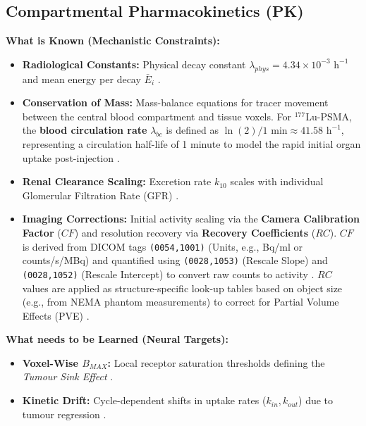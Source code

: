 \documentclass[11pt,a4paper]{article}
\begin{document}
\subsection{Compartmental Pharmacokinetics (PK)}
\textbf{What is Known (Mechanistic Constraints):}
\begin{itemize}
    \item \textbf{Radiological Constants:} Physical decay constant $\lambda_{phys} = 4.34 \times 10^{-3} \text{ h}^{-1}$ and mean energy per decay $\bar{E}_i$ \cite{ReschFouladgar2023, StabinMadsen2019}.
    \item \textbf{Conservation of Mass:} Mass-balance equations for tracer movement between the central blood compartment and tissue voxels. For $^{177}$Lu-PSMA, the \textbf{blood circulation rate} $\lambda_{bc}$ is defined as $\ln(2)/1 \text{ min} \approx 41.58 \text{ h}^{-1}$, representing a circulation half-life of 1 minute to model the rapid initial organ uptake post-injection \cite{HardiansyahYousefzadehNowshahr2024}.
    \item \textbf{Renal Clearance Scaling:} Excretion rate $k_{10}$ scales with individual Glomerular Filtration Rate (GFR) \cite{HardiansyahYousefzadehNowshahr2024}.
    \item \textbf{Imaging Corrections:} Initial activity scaling via the \textbf{Camera Calibration Factor} ($CF$) and resolution recovery via \textbf{Recovery Coefficients} ($RC$). $CF$ is derived from DICOM tags \texttt{(0054,1001)} (Units, e.g., Bq/ml or counts/s/MBq) and quantified using \texttt{(0028,1053)} (Rescale Slope) and \texttt{(0028,1052)} (Rescale Intercept) to convert raw counts to activity \cite{GleisnerChouin2022}. $RC$ values are applied as structure-specific look-up tables based on object size (e.g., from NEMA phantom measurements) to correct for Partial Volume Effects (PVE) \cite{KlettingSchimmel2015}.
\end{itemize}

\textbf{What needs to be Learned (Neural Targets):}
\begin{itemize}
    \item \textbf{Voxel-Wise $B_{MAX}$:} Local receptor saturation thresholds defining the \textit{Tumour Sink Effect} \cite{BegumThieme2018}.
    \item \textbf{Kinetic Drift:} Cycle-dependent shifts in uptake rates ($k_{in}, k_{out}$) due to tumour regression \cite{OkamotoThieme2016, SiebingaVeen2024}.
\end{itemize}
\end{document}
